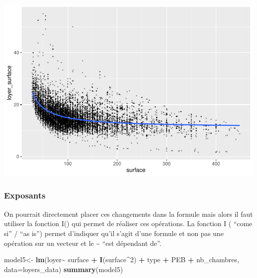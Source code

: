 \documentclass[
]{book}
\newenvironment{Shaded}{\begin{snugshade}}{\end{snugshade}}
\newcommand{\AttributeTok}[1]{\textcolor[rgb]{0.13,0.29,0.53}{#1}}
\newcommand{\DecValTok}[1]{\textcolor[rgb]{0.00,0.00,0.81}{#1}}
\newcommand{\FunctionTok}[1]{\textcolor[rgb]{0.13,0.29,0.53}{\textbf{#1}}}
\newcommand{\NormalTok}[1]{#1}
\newcommand{\OtherTok}[1]{\textcolor[rgb]{0.56,0.35,0.01}{#1}}
\newcommand{\SpecialCharTok}[1]{\textcolor[rgb]{0.81,0.36,0.00}{\textbf{#1}}}
\begin{document}
\includegraphics{bookdown-demo_files/figure-latex/unnamed-chunk-15-1.pdf}

\hypertarget{exposants}{%
\subsubsection{Exposants}\label{exposants}}

On pourrait directement placer ces changements dans la formule mais
alors il faut utiliser la fonction I() qui permet de réaliser ces
opérations. La fonction I ( ``come si'' / ``as is'') permet d'indiquer qu'il
s'agit d'une formule et non pas une opération sur un vecteur et le \textasciitilde{}
``est dépendant de''.

\begin{Shaded}
\begin{Highlighting}[]
\NormalTok{model5}\OtherTok{\textless{}{-}} \FunctionTok{lm}\NormalTok{(loyer}\SpecialCharTok{\textasciitilde{}}\NormalTok{ surface }\SpecialCharTok{+} \FunctionTok{I}\NormalTok{(surface}\SpecialCharTok{\^{}}\DecValTok{2}\NormalTok{) }\SpecialCharTok{+}\NormalTok{  type }\SpecialCharTok{+}\NormalTok{ PEB }\SpecialCharTok{+}\NormalTok{ nb\_chambres, }\AttributeTok{data=}\NormalTok{loyers\_data)}
\FunctionTok{summary}\NormalTok{(model5)}
\end{Highlighting}
\end{Shaded}
\end{document}
